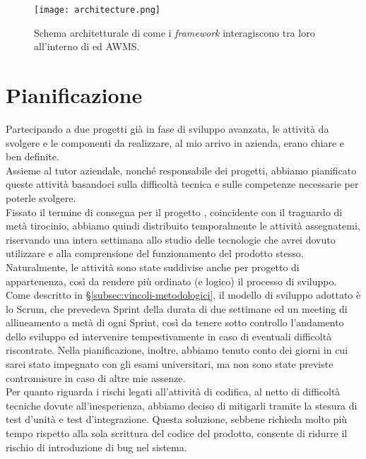 \begin{figure}[h]
\texttt{[image: architecture.png]}
\centering
\caption{Schema architetturale di come i \textit{framework} interagiscono tra loro all'interno di \DS{} ed AWMS.} 
\label{fig:architecture}
\end{figure}

\section{Pianificazione}
Partecipando a due progetti già in fase di sviluppo avanzata, le attività da svolgere e le componenti da realizzare, al mio arrivo in azienda, erano chiare e ben definite. \\
Assieme al tutor aziendale, nonché responsabile dei progetti, abbiamo pianificato queste attività basandoci sulla difficoltà tecnica e sulle competenze necessarie per poterle svolgere.\\
Fissato il termine di consegna per il progetto \DS{}, coincidente con il traguardo di metà tirocinio, abbiamo quindi distribuito temporalmente le attività assegnatemi, riservando una intera settimana allo studio delle tecnologie che avrei dovuto utilizzare e alla comprensione del funzionamento del prodotto stesso.\\
Naturalmente, le attività sono state suddivise anche per progetto di appartenenza, così da rendere più ordinato (e logico) il processo di sviluppo.\\
Come descritto in §\ref{subsec:vincoli-metodologici}, il modello di sviluppo adottato è lo Scrum, che prevedeva Sprint della durata di due settimane ed un meeting di allineamento a metà di ogni Sprint, così da tenere sotto controllo l'andamento dello sviluppo ed intervenire tempestivamente in caso di eventuali difficoltà riscontrate.
Nella pianificazione, inoltre, abbiamo tenuto conto dei giorni in cui sarei stato impegnato con gli esami universitari, ma non sono state previste contromisure in caso di altre mie assenze.\\
Per quanto riguarda i rischi legati all'attività di codifica, al netto di difficoltà tecniche dovute all'inesperienza, abbiamo deciso di mitigarli tramite la stesura di test d'unità e test d'integrazione. Questa soluzione, sebbene richieda molto più tempo rispetto alla sola scrittura del codice del prodotto, consente di ridurre il rischio di introduzione di bug nel sistema.
